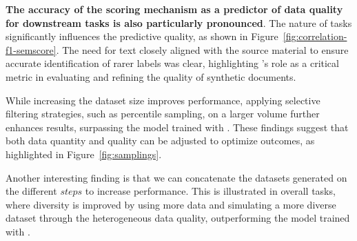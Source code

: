 \textbf{The accuracy of the \score scoring mechanism as a predictor of data quality for downstream tasks is also particularly pronounced}. The nature of tasks significantly influences the predictive quality, as shown in Figure~\ref{fig:correlation-f1-semscore}. The need for text closely aligned with the source material to ensure accurate identification of rarer labels was clear, highlighting \score's role as a critical metric in evaluating and refining the quality of synthetic documents.

While increasing the dataset size improves performance, applying selective filtering strategies, such as percentile sampling, on a larger volume further enhances results, surpassing the model trained with \dgold. These findings suggest that both data quantity and quality can be adjusted to optimize outcomes, as highlighted in Figure~\ref{fig:samplings}.

Another interesting finding is that we can concatenate the datasets generated on the different $steps$ to increase performance. This is illustrated in overall tasks, where diversity is improved by using more data and simulating a more diverse dataset through the heterogeneous data quality, outperforming the model trained with \dgover.
